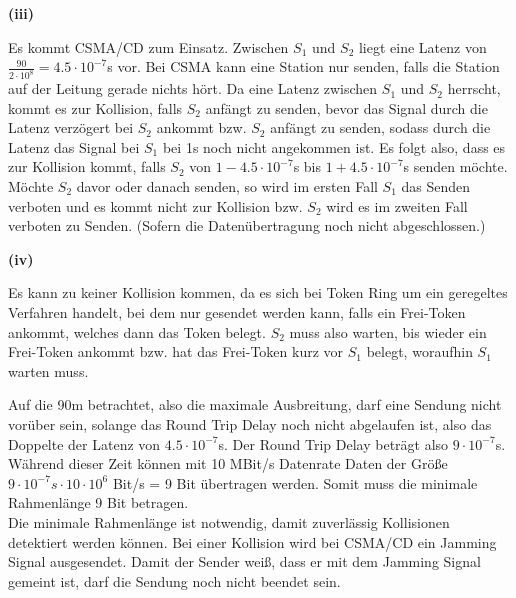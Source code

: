 \documentclass{../exercisesheet}
\begin{document}
\begin{exercise}{6}
\begin{subexercise}
\textbf{(iii)}
\begin{adjustwidth}{2em}{0em}\vspace{-\baselineskip}
	Es kommt CSMA/CD zum Einsatz. Zwischen $S_1$ und $S_2$ liegt eine Latenz von $\frac{90}{2 \cdot 10^8}= 4.5\cdot 10^{-7}$s vor. Bei CSMA kann eine Station nur senden, 
	falls die Station auf der Leitung gerade nichts hört. Da eine Latenz zwischen $S_1$ und $S_2$ herrscht, kommt es zur Kollision, falls $S_2$ anfängt zu senden, bevor
	das Signal durch die Latenz verzögert bei $S_2$ ankommt bzw. $S_2$ anfängt zu senden, sodass durch die Latenz das Signal bei $S_1$ bei 1s noch nicht angekommen ist.
	Es folgt also, dass es zur Kollision kommt, falls $S_2$ von $1-4.5\cdot 10^{-7}$s bis $1+4.5\cdot 10^{-7}$s senden möchte. Möchte $S_2$ davor oder danach senden, so
	wird im ersten Fall $S_1$ das Senden verboten und es kommt nicht zur Kollision bzw. $S_2$ wird es im zweiten Fall verboten zu Senden. (Sofern die Datenübertragung noch nicht abgeschlossen.)\\
\end{adjustwidth}
\textbf{(iv)}
\begin{adjustwidth}{2em}{0em}\vspace{-\baselineskip}
	Es kann zu keiner Kollision kommen, da es sich bei Token Ring um ein geregeltes Verfahren handelt, bei dem nur gesendet werden kann, falls ein Frei-Token ankommt, 
	welches dann das Token belegt. $S_2$ muss also warten, bis wieder ein Frei-Token ankommt bzw. hat das Frei-Token kurz vor $S_1$ belegt, woraufhin $S_1$ warten muss.
\end{adjustwidth}
\end{subexercise}
\begin{subexercise}
	Auf die 90m betrachtet, also die maximale Ausbreitung, darf eine Sendung nicht vorüber sein, solange das Round Trip Delay noch nicht abgelaufen ist, also das Doppelte
	der Latenz von $4.5\cdot 10^{-7}$s. Der Round Trip Delay beträgt also $9\cdot 10^{-7}$s. Während dieser Zeit können mit 10 MBit/s Datenrate Daten der
	Größe $9\cdot 10^{-7}s \cdot 10 \cdot 10^6$ Bit/s = 9 Bit übertragen werden. Somit muss die minimale Rahmenlänge 9 Bit betragen.\\
	Die minimale Rahmenlänge ist notwendig, damit zuverlässig Kollisionen detektiert werden können. Bei einer Kollision wird bei CSMA/CD ein Jamming Signal ausgesendet. Damit
	der Sender weiß, dass er mit dem Jamming Signal gemeint ist, darf die Sendung noch nicht beendet sein.
\end{subexercise}
\begin{subexercise}

\end{subexercise}
\end{exercise}
\end{document}
